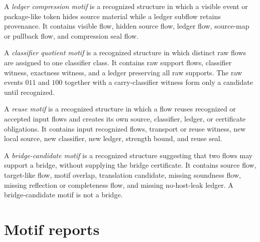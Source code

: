 \begin{definition}
\label{def:motif-report-ledger-compression}
A \emph{ledger compression motif} is a recognized structure in which a visible event or package-like token hides source material while a ledger subflow retains provenance. It contains visible flow, hidden source flow, ledger flow, source-map or pullback flow, and compression seal flow.
\end{definition}

\begin{definition}
\label{def:motif-report-classifier-quotient}
A \emph{classifier quotient motif} is a recognized structure in which distinct raw flows are assigned to one classifier class. It contains raw support flows, classifier witness, exactness witness, and a ledger preserving all raw supports. The raw events $011$ and $100$ together with a carry-classifier witness form only a candidate until recognized.
\end{definition}

\begin{definition}
\label{def:motif-report-reuse}
A \emph{reuse motif} is a recognized structure in which a flow reuses recognized or accepted input flows and creates its own source, classifier, ledger, or certificate obligations. It contains input recognized flows, transport or reuse witness, new local source, new classifier, new ledger, strength bound, and reuse seal.
\end{definition}

\begin{definition}
\label{def:motif-report-bridge-candidate}
A \emph{bridge-candidate motif} is a recognized structure suggesting that two flows may support a bridge, without supplying the bridge certificate. It contains source flow, target-like flow, motif overlap, translation candidate, missing soundness flow, missing reflection or completeness flow, and missing no-host-leak ledger. A bridge-candidate motif is not a bridge.
\end{definition}

\section{Motif reports}
\label{sec:motif-report-reports}

